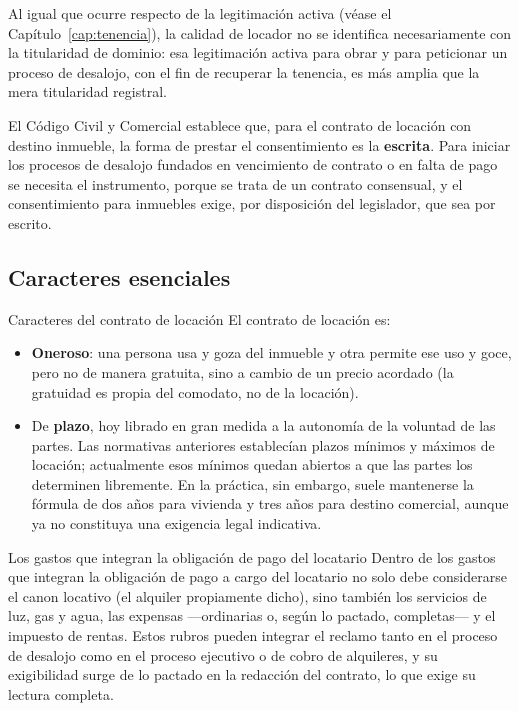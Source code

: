 \documentclass[12pt,oneside]{book}
\begin{document}
Al igual que ocurre respecto de la legitimación activa (véase el Capítulo~\ref{cap:tenencia}), la calidad de locador no se identifica necesariamente con la titularidad de dominio: esa legitimación activa para obrar y para peticionar un proceso de desalojo, con el fin de recuperar la tenencia, es más amplia que la mera titularidad registral.

\begin{important}
El Código Civil y Comercial establece que, para el contrato de locación con destino inmueble, la forma de prestar el consentimiento es la \textbf{escrita}. Para iniciar los procesos de desalojo fundados en vencimiento de contrato o en falta de pago se necesita el instrumento, porque se trata de un contrato consensual, y el consentimiento para inmuebles exige, por disposición del legislador, que sea por escrito.
\end{important}

\subsection{Caracteres esenciales}

\begin{definition}{Caracteres del contrato de locación}
El contrato de locación es:
\begin{itemize}
\item \textbf{Oneroso}: una persona usa y goza del inmueble y otra permite ese uso y goce, pero no de manera gratuita, sino a cambio de un precio acordado (la gratuidad es propia del comodato, no de la locación).
\item De \textbf{plazo}, hoy librado en gran medida a la autonomía de la voluntad de las partes. Las normativas anteriores establecían plazos mínimos y máximos de locación; actualmente esos mínimos quedan abiertos a que las partes los determinen libremente. En la práctica, sin embargo, suele mantenerse la fórmula de dos años para vivienda y tres años para destino comercial, aunque ya no constituya una exigencia legal indicativa.
\end{itemize}
\end{definition}

\begin{example}{Los gastos que integran la obligación de pago del locatario}
Dentro de los gastos que integran la obligación de pago a cargo del locatario no solo debe considerarse el canon locativo (el alquiler propiamente dicho), sino también los servicios de luz, gas y agua, las expensas ---ordinarias o, según lo pactado, completas--- y el impuesto de rentas. Estos rubros pueden integrar el reclamo tanto en el proceso de desalojo como en el proceso ejecutivo o de cobro de alquileres, y su exigibilidad surge de lo pactado en la redacción del contrato, lo que exige su lectura completa.
\end{example}
\end{document}
